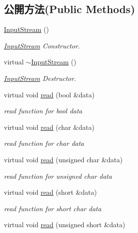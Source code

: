 \subsection*{公開方法(Public Methods)}
\begin{DoxyCompactItemize}
\item 
\hyperlink{class_magnum_1_1_input_stream_a665d826d9ff448376446a072dc823b5f}{Input\+Stream} ()
\begin{DoxyCompactList}\small\item\em \hyperlink{class_magnum_1_1_input_stream}{Input\+Stream} Constructor. \end{DoxyCompactList}\item 
virtual \hyperlink{class_magnum_1_1_input_stream_ae71831adce618d60783c287a2ac7075a}{$\sim$\+Input\+Stream} ()
\begin{DoxyCompactList}\small\item\em \hyperlink{class_magnum_1_1_input_stream}{Input\+Stream} Destructor. \end{DoxyCompactList}\item 
virtual void \hyperlink{class_magnum_1_1_input_stream_abf81563a45454f198366e06a8cf4b27b}{read} (bool \&data)
\begin{DoxyCompactList}\small\item\em read function for bool data \end{DoxyCompactList}\item 
virtual void \hyperlink{class_magnum_1_1_input_stream_a174a51441a2630a8afeb08fac726f3ab}{read} (char \&data)
\begin{DoxyCompactList}\small\item\em read function for char data \end{DoxyCompactList}\item 
virtual void \hyperlink{class_magnum_1_1_input_stream_a1ff54d938219e4588ba5a7e4c1238de1}{read} (unsigned char \&data)
\begin{DoxyCompactList}\small\item\em read function for unsigned char data \end{DoxyCompactList}\item 
virtual void \hyperlink{class_magnum_1_1_input_stream_ac2b967dc82ccc626db741ae16974e615}{read} (short \&data)
\begin{DoxyCompactList}\small\item\em read function for short char data \end{DoxyCompactList}\item 
virtual void \hyperlink{class_magnum_1_1_input_stream_a52b36dfa371d294d3909e6e95f0f5f2e}{read} (unsigned short \&data)

\end{DoxyCompactItemize}
